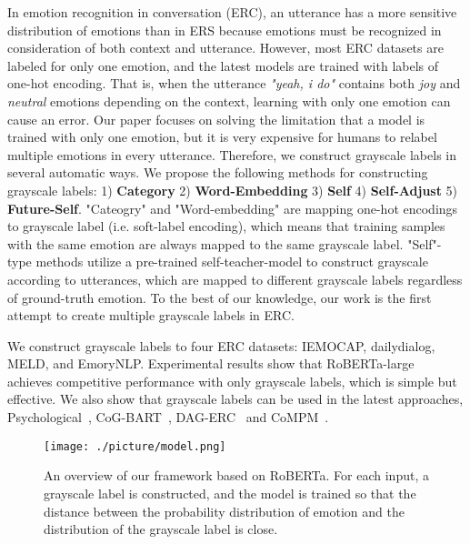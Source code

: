 \documentclass[a4paper]{article}
\begin{document}
In emotion recognition in conversation (ERC), an utterance has a more sensitive distribution of emotions than in ERS because emotions must be recognized in consideration of both context and utterance. However, most ERC datasets are labeled for only one emotion, and the latest models are trained with labels of one-hot encoding. That is, when the utterance \textit{"yeah, i do"} contains both \textit{joy} and \textit{neutral} emotions depending on the context, learning with only one emotion can cause an error. Our paper focuses on solving the limitation that a model is trained with only one emotion, but it is very expensive for humans to relabel multiple emotions in every utterance. Therefore, we construct grayscale labels in several automatic ways. We propose the following methods for constructing grayscale labels: 1) \textbf{Category} 2) \textbf{Word-Embedding} 3) \textbf{Self} 4) \textbf{Self-Adjust} 5) \textbf{Future-Self}. "Cateogry" and "Word-embedding" are mapping one-hot encodings to grayscale label (i.e. soft-label encoding), which means that training samples with the same emotion are always mapped to the same grayscale label. "Self"-type methods utilize a pre-trained self-teacher-model to construct grayscale according to utterances, which are mapped to different grayscale labels regardless of ground-truth emotion. To the best of our knowledge, our work is the first attempt to create multiple grayscale labels in ERC.





We construct grayscale labels to four ERC datasets: IEMOCAP, dailydialog, MELD, and EmoryNLP. Experimental results show that RoBERTa-large~\cite{RoBERTa} achieves competitive performance with only grayscale labels, which is simple but effective. We also show that grayscale labels can be used in the latest approaches, Psychological~\cite{li-etal-2021-past-present}, CoG-BART~\cite{li2021contrast}, DAG-ERC~\cite{shen-etal-2021-directed} and CoMPM~\cite{lee2021compm}.


\begin{figure*}[!t]
    \centering 
    \texttt{[image: ./picture/model.png]}
    \caption{An overview of our framework based on RoBERTa. For each input, a grayscale label is constructed, and the model is trained so that the distance between the probability distribution of emotion and the distribution of the grayscale label is close.}
    \label{fig:Model}
\end{figure*}
\end{document}
